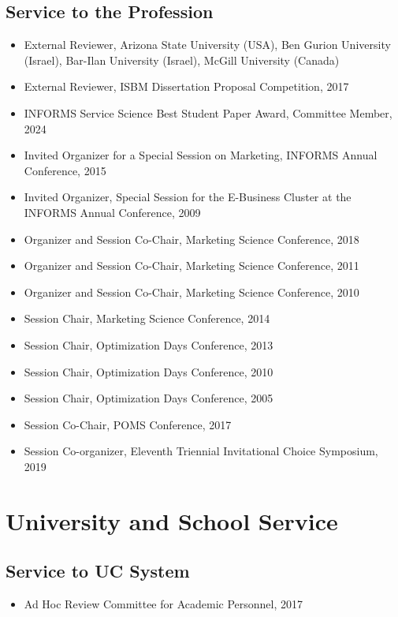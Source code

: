 \documentclass[10pt]{article}
\begin{document}
\subsection{Service to the Profession}

\begin{itemize}
 \item[] External Reviewer, Arizona State University (USA), Ben Gurion University (Israel), Bar-Ilan University (Israel), McGill University (Canada) 
 \item[] External Reviewer, ISBM Dissertation Proposal Competition, 2017 
 \item[] INFORMS Service Science Best Student Paper Award, Committee Member, 2024 
 \item[] Invited Organizer for a Special Session on Marketing, INFORMS Annual Conference, 2015 \item[] Invited Organizer, Special Session for the E-Business Cluster at the INFORMS Annual Conference, 2009 \item[] Organizer and Session Co-Chair, Marketing Science Conference, 2018 \item[] Organizer and Session Co-Chair, Marketing Science Conference, 2011 \item[] Organizer and Session Co-Chair, Marketing Science Conference, 2010 \item[] Session Chair, Marketing Science Conference, 2014 \item[] Session Chair, Optimization Days Conference, 2013 \item[] Session Chair, Optimization Days Conference, 2010 \item[] Session Chair, Optimization Days Conference, 2005 \item[] Session Co-Chair, POMS Conference, 2017 \item[] Session Co-organizer, Eleventh Triennial Invitational Choice Symposium, 2019
\end{itemize}
\section{University and School Service}
\subsection{Service to UC System}
 \begin{itemize}
 \item[] Ad Hoc Review Committee for Academic Personnel, 2017
 \end{itemize}
\end{document}
